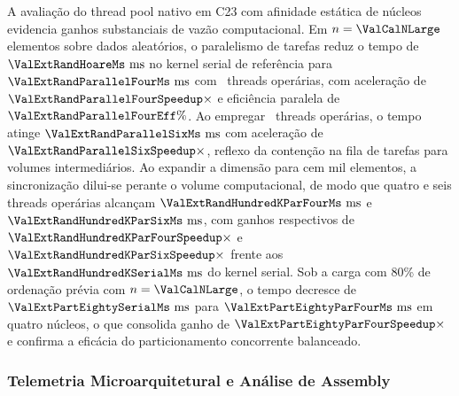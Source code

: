\documentclass[12pt]{article}
\begin{document}
A avaliação do thread pool nativo em C23 com afinidade estática de núcleos evidencia ganhos substanciais de vazão computacional. Em $n = \ValCalNLarge$ elementos sobre dados aleatórios, o paralelismo de tarefas reduz o tempo de $\ValExtRandHoareMs\text{ ms}$ no kernel serial de referência para $\ValExtRandParallelFourMs\text{ ms}$ com \ValParThreadsFour\ threads operárias, com aceleração de $\ValExtRandParallelFourSpeedup\times$ e eficiência paralela de $\ValExtRandParallelFourEff\%$. Ao empregar \ValParThreadsSix\ threads operárias, o tempo atinge $\ValExtRandParallelSixMs\text{ ms}$ com aceleração de $\ValExtRandParallelSixSpeedup\times$, reflexo da contenção na fila de tarefas para volumes intermediários. Ao expandir a dimensão para cem mil elementos, a sincronização dilui-se perante o volume computacional, de modo que quatro e seis threads operárias alcançam $\ValExtRandHundredKParFourMs\text{ ms}$ e $\ValExtRandHundredKParSixMs\text{ ms}$, com ganhos respectivos de $\ValExtRandHundredKParFourSpeedup\times$ e $\ValExtRandHundredKParSixSpeedup\times$ frente aos $\ValExtRandHundredKSerialMs\text{ ms}$ do kernel serial. Sob a carga com 80\% de ordenação prévia com $n=\ValCalNLarge$, o tempo decresce de $\ValExtPartEightySerialMs\text{ ms}$ para $\ValExtPartEightyParFourMs\text{ ms}$ em quatro núcleos, o que consolida ganho de $\ValExtPartEightyParFourSpeedup\times$ e confirma a eficácia do particionamento concorrente balanceado.

\subsubsection{Telemetria Microarquitetural e Análise de Assembly}\label{sec:res-micro-jit}
\end{document}
